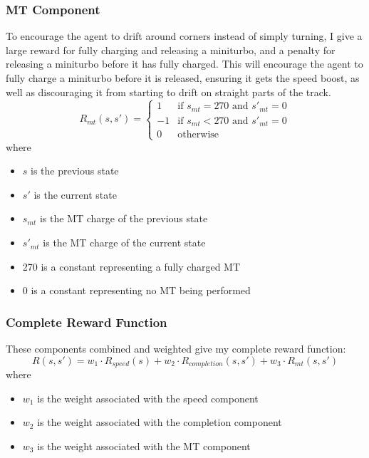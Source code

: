 \subsubsection{MT Component}
To encourage the agent to drift around corners instead of simply turning, I give a large reward for fully charging and releasing a miniturbo, and a penalty for releasing a miniturbo before it has fully charged. This will encourage the agent to fully charge a miniturbo before it is released, ensuring it gets the speed boost, as well as discouraging it from starting to drift on straight parts of the track.
\[
R_{mt}(s, s') = 
\begin{cases}
     1 &\text{if }s_{mt} = 270\text{ and }s'_{mt} = 0\\
     -1 &\text{if }s_{mt} < 270\text{ and } s'_{mt} = 0 \\
     0 & \text{otherwise}
\end{cases}
\]
where
\begin{itemize}
    \item $s$ is the previous state
    \item $s'$ is the current state
    \item $s_{mt}$ is the MT charge of the previous state
    \item $s'_{mt}$ is the MT charge of the current state
    \item 270 is a constant representing a fully charged MT
    \item 0 is a constant representing no MT being performed
\end{itemize}
\subsubsection{Complete Reward Function}
These components combined and weighted give my complete reward function:
\[
R(s,s') = w_1 \cdot R_{speed}(s) + w_2 \cdot R_{completion}(s,s') + w_3 \cdot R_{mt}(s,s')
\]
where
\begin{itemize}
    \item $w_1$ is the weight associated with the speed component
    \item $w_2$ is the weight associated with the completion component
    \item $w_3$ is the weight associated with the MT component
\end{itemize}
